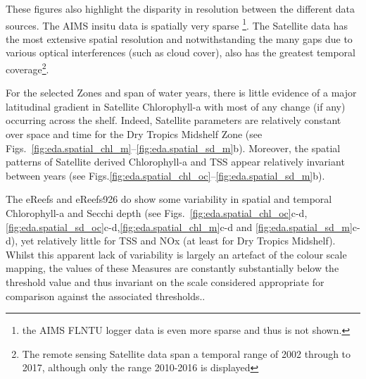 These figures also highlight the disparity in resolution
between the different data sources. The AIMS insitu data is spatially very sparse \footnote{the AIMS
FLNTU logger data is even more sparse and thus is not shown.}.  The Satellite data has the most
extensive spatial resolution and notwithstanding the many gaps due to various optical interferences
(such as cloud cover), also has the greatest temporal coverage\footnote{The remote sensing Satellite data
span a temporal range of 2002 through to 2017, although only the range 2010-2016 is displayed}.

For the selected Zones and span of water years, there is little evidence of a major latitudinal
gradient in Satellite Chlorophyll-a with most of any change (if any) occurring across the shelf.
Indeed, Satellite parameters are relatively constant over space and time for the Dry Tropics
Midshelf Zone (see Figs.~\ref{fig:eda.spatial_chl_m}--\ref{fig:eda.spatial_sd_m}b).  Moreover, the
spatial patterns of Satellite derived Chlorophyll-a and TSS appear relatively invariant between
years (see Figs.\ref{fig:eda.spatial_chl_oc}--\ref{fig:eda.spatial_sd_m}b).

The eReefs and eReefs926 do show some variability in spatial and temporal Chlorophyll-a and Secchi
depth (see
Figs.~\ref{fig:eda.spatial_chl_oc}c-d,\ref{fig:eda.spatial_sd_oc}c-d,\ref{fig:eda.spatial_chl_m}c-d
and \ref{fig:eda.spatial_sd_m}c-d), yet relatively little for TSS and NOx (at least for Dry Tropics
Midshelf).  Whilst this apparent lack of variability is largely an artefact of the colour scale mapping,
the values of these Measures are constantly
substantially below the threshold value and thus invariant on the scale considered
appropriate for comparison against the associated thresholds..




